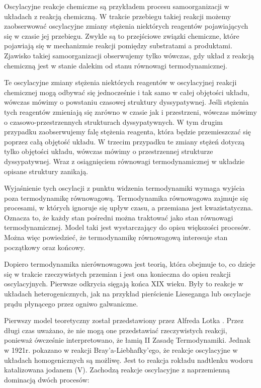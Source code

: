 \documentclass[10pt, a4paper, twoside, onecolumn]{article}
\numberwithin{equation}{section}
\begin{document}
	Oscylacyjne reakcje chemiczne są przykładem procesu samoorganizacji w układach z reakcją chemiczną. W trakcie przebiegu takiej reakcji możemy zaobserwować oscylacyjne zmiany stężenia niektórych reagentów pojawiających się w czasie jej przebiegu. Zwykle są to przejściowe związki chemiczne, które pojawiają się w mechanizmie reakcji pomiędzy substratami a produktami. Zjawisko takiej samoorganizacji obserwujemy tylko wówczas, gdy układ z reakcją chemiczną jest w stanie dalekim od stanu równowagi termodynamicznej. \par
	Te oscylacyjne zmiany stężenia niektórych reagentów w oscylacyjnej reakcji chemicznej mogą odbywać się jednocześnie i tak samo w całej objętości układu, wówczas mówimy o powstaniu czasowej struktury dyssypatywnej. Jeśli stężenia tych reagentów zmieniają się zarówno w czasie jak i przestrzeni, wówczas mówimy o czasowo-przestrzennych strukturach dyssypatywnych. W tym drugim przypadku zaobserwujemy falę stężenia reagenta, która będzie przemieszczać się poprzez całą objętość układu. W trzecim przypadku te zmiany stężeń dotyczą tylko objętości układu, wówczas mówimy o przestrzennej strukturze dyssypatywnej. Wraz z osiągnięciem równowagi termodynamicznej w układzie opisane struktury zanikają. 
	
	
	Wyjaśnienie tych oscylacji z punktu widzenia termodynamiki wymaga wyjścia poza termodynamikę równowagową. Termodynamika równowagowa zajmuje się procesami, w których ignoruje się upływ czasu, a przemiana jest kwazistatyczna. Oznacza to, że każdy stan pośredni można traktować jako stan równowagi termodynamicznej. Model taki jest wystarczający do opisu większości procesów. Można więc powiedzieć, że termodynamikę równowagową interesuje stan początkowy oraz końcowy. \par
	Dopiero termodynamika nierównowagowa jest teorią, która obejmuje to, co dzieje się w trakcie rzeczywistych przemian i jest ona konieczna do opisu reakcji oscylacyjnych. Pierwsze odkrycia sięgają końca XIX wieku. Były to reakcje w układach heterogenicznych, jak na przykład pierścienie Lieseganga lub oscylacje prądu płynącego przez ogniwo galwaniczne. 
	
	\par
	Pierwszy model teoretyczny został przedstawiony przez Alfreda Lotka \cite{lotka}. Przez długi czas uważano, że nie mogą one przedstawiać rzeczywistych reakcji, ponieważ ówcześnie interpretowano, że łamią II Zasadę Termodynamiki. Jednak w 1921r. pokazano w reakcji Bray'a-Liebhafky'ego, że reakcje oscylacyjne w układach homogenicznych są możliwę. Jest to reakcja rokładu nadtlenku wodoru katalizowana jodanem (V). Zachodzą reakcje oscylacyjne z naprzemienną dominacją dwóch procesów: \cite{orlik}
	\begin{center}
		 \\
	\end{center}
\end{document}
